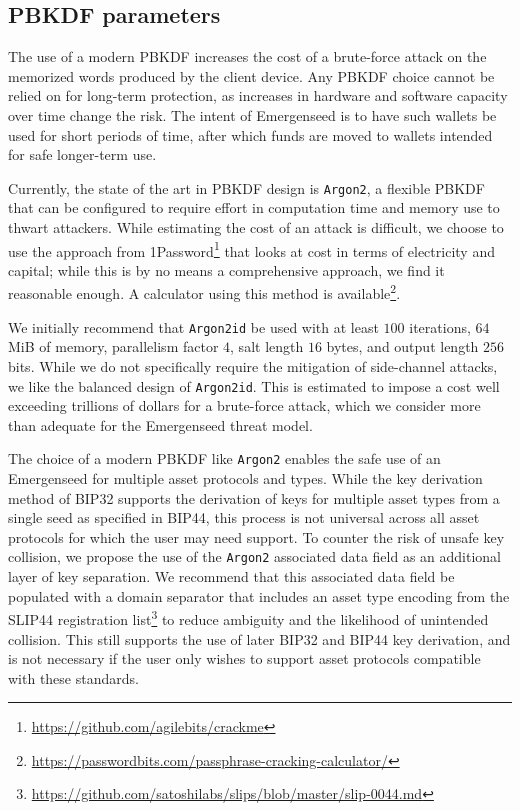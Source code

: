 \documentclass{article}
\begin{document}
\subsection{PBKDF parameters}

The use of a modern PBKDF increases the cost of a brute-force attack on the memorized words produced by the client device.
Any PBKDF choice cannot be relied on for long-term protection, as increases in hardware and software capacity over time change the risk.
The intent of Emergenseed is to have such wallets be used for short periods of time, after which funds are moved to wallets intended for safe longer-term use.

Currently, the state of the art in PBKDF design is \texttt{Argon2}, a flexible PBKDF that can be configured to require effort in computation time and memory use to thwart attackers.
While estimating the cost of an attack is difficult, we choose to use the approach from 1Password\footnote{\url{https://github.com/agilebits/crackme}} that looks at cost in terms of electricity and capital; while this is by no means a comprehensive approach, we find it reasonable enough.
A calculator using this method is available\footnote{\url{https://passwordbits.com/passphrase-cracking-calculator/}}.

We initially recommend that \texttt{Argon2id} be used with at least $100$ iterations, $64$ MiB of memory, parallelism factor $4$, salt length $16$ bytes, and output length $256$ bits.
While we do not specifically require the mitigation of side-channel attacks, we like the balanced design of \texttt{Argon2id}.
This is estimated to impose a cost well exceeding trillions of dollars for a brute-force attack, which we consider more than adequate for the Emergenseed threat model.

The choice of a modern PBKDF like \texttt{Argon2} enables the safe use of an Emergenseed for multiple asset protocols and types.
While the key derivation method of BIP32 supports the derivation of keys for multiple asset types from a single seed as specified in BIP44, this process is not universal across all asset protocols for which the user may need support.
To counter the risk of unsafe key collision, we propose the use of the \texttt{Argon2} associated data field as an additional layer of key separation.
We recommend that this associated data field be populated with a domain separator that includes an asset type encoding from the SLIP44 registration list\footnote{\url{https://github.com/satoshilabs/slips/blob/master/slip-0044.md}} to reduce ambiguity and the likelihood of unintended collision.
This still supports the use of later BIP32 and BIP44 key derivation, and is not necessary if the user only wishes to support asset protocols compatible with these standards.
\end{document}
